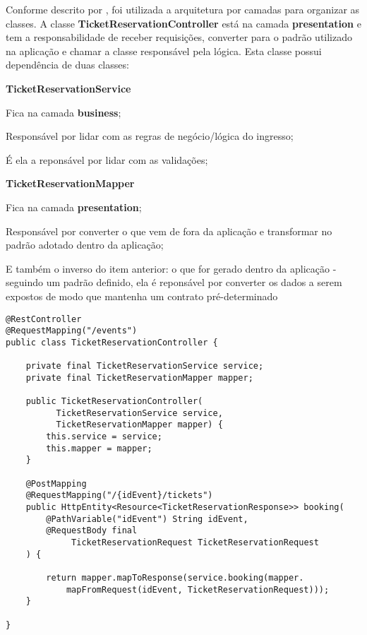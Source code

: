 Conforme descrito por \cite{mark-richards-software-architecture-patterns},
foi utilizada a arquitetura por camadas para organizar as classes.
A classe \textbf{TicketReservationController} está na camada \textbf{presentation} e tem a
responsabilidade de receber requisições, converter para o padrão utilizado na
aplicação e chamar a classe responsável pela lógica.
Esta classe possui dependência de duas classes:

\begin{alineas}

  \item \textbf{TicketReservationService}

  \begin{alineas}
     \item Fica na camada \textbf{business};
     \item Responsável por lidar com as regras de negócio/lógica do ingresso;
     \item É ela a reponsável por lidar com as validações;
  \end{alineas}

  \item \textbf{TicketReservationMapper}

  \begin{alineas}
     \item Fica na camada \textbf{presentation};
     \item Responsável por converter o que vem de fora da aplicação e transformar
           no padrão adotado dentro da aplicação;
     \item E também o inverso do item anterior: o que for gerado dentro da aplicação -
           seguindo um padrão definido, ela é reponsável por converter
           os dados a serem expostos de modo que mantenha um contrato pré-determinado
  \end{alineas}

\end{alineas}

\begin{lstlisting}[label=classe-ticket-reservation-reservation-controller,caption=Classe TicketReservationController em Java]
@RestController
@RequestMapping("/events")
public class TicketReservationController {

    private final TicketReservationService service;
    private final TicketReservationMapper mapper;

    public TicketReservationController(
          TicketReservationService service,
          TicketReservationMapper mapper) {
        this.service = service;
        this.mapper = mapper;
    }

    @PostMapping
    @RequestMapping("/{idEvent}/tickets")
    public HttpEntity<Resource<TicketReservationResponse>> booking(
        @PathVariable("idEvent") String idEvent,
        @RequestBody final
             TicketReservationRequest TicketReservationRequest
    ) {

        return mapper.mapToResponse(service.booking(mapper.
            mapFromRequest(idEvent, TicketReservationRequest)));
    }

}
\end{lstlisting}

